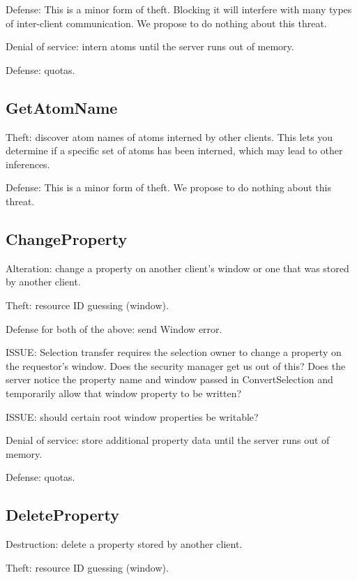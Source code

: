 Defense: This is a minor form of theft.  Blocking it will interfere
with many types of inter-client communication.  We propose to do
nothing about this threat.

Denial of service: intern atoms until the server runs out of memory.

Defense: quotas.



\subsection{GetAtomName}

Theft: discover atom names of atoms interned by other clients.
This lets you determine if a specific set of atoms has been
interned, which may lead to other inferences.

Defense: This is a minor form of theft.  We propose to do nothing
about this threat.



\subsection{ChangeProperty}

Alteration: change a property on another client's window or one that
was stored by another client.

Theft: resource ID guessing (window).

Defense for both of the above: send Window error.

ISSUE: Selection transfer requires the selection owner to change a
property on the requestor's window.  Does the security manager get us
out of this?  Does the server notice the property name and window
passed in ConvertSelection and temporarily allow that window property
to be written?

ISSUE: should certain root window properties be writable?

Denial of service: store additional property data until the server
runs out of memory.

Defense: quotas.



\subsection{DeleteProperty}

Destruction: delete a property stored by another client.

Theft: resource ID guessing (window).


